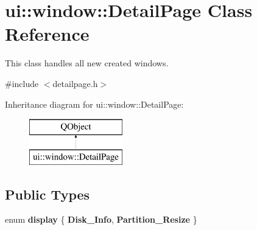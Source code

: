 \hypertarget{classui_1_1window_1_1_detail_page}{}\section{ui\+:\+:window\+:\+:Detail\+Page Class Reference}
\label{classui_1_1window_1_1_detail_page}


This class handles all new created windows.  




{\ttfamily \#include $<$detailpage.\+h$>$}

Inheritance diagram for ui\+:\+:window\+:\+:Detail\+Page\+:\begin{figure}[H]
\begin{center}
\leavevmode
\includegraphics[height=2.000000cm]{classui_1_1window_1_1_detail_page}
\end{center}
\end{figure}
\subsection*{Public Types}
\begin{DoxyCompactItemize}
\item 
\mbox{\label{classui_1_1window_1_1_detail_page_a4104cccd964dece9660152be1109e987}} 
enum {\bfseries display} \{ {\bfseries Disk\+\_\+\+Info}, 
{\bfseries Partition\+\_\+\+Resize}
 \}
\end{DoxyCompactItemize}
